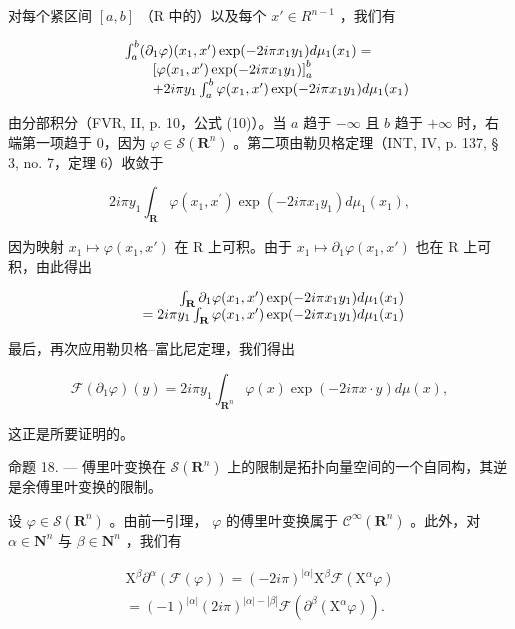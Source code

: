 对每个紧区间 \([a,b]\) （R 中的）以及每个 \(x'\in R^{n-1}\) ，我们有

\[
\begin{array}{r l} & {\int_ {a} ^ {b} (\partial_ {1} \varphi) (x _ {1}, x ^ {\prime}) \exp (- 2 i \pi x _ {1} y _ {1}) d \mu_ {1} (x _ {1}) =} \\ & {\qquad \left[ \varphi (x _ {1}, x ^ {\prime}) \exp (- 2 i \pi x _ {1} y _ {1}) \right] _ {a} ^ {b}} \\ & {\qquad + 2 i \pi y _ {1} \int_ {a} ^ {b} \varphi (x _ {1}, x ^ {\prime}) \exp (- 2 i \pi x _ {1} y _ {1}) d \mu_ {1} (x _ {1})} \end{array}
\]

由分部积分（FVR, II, p. 10，公式 (10)）。当 \(a\) 趋于 \(-\infty\) 且 \(b\) 趋于 \(+\infty\) 时，右端第一项趋于 0，因为 \(\varphi \in \mathcal{S}(\mathbf{R}^n)\) 。第二项由勒贝格定理（INT, IV, p. 137, § 3, no. 7，定理 6）收敛于

\[
2 i \pi y _ {1} \int_ {\mathbf {R}} \varphi (x _ {1}, x ^ {\prime}) \exp (- 2 i \pi x _ {1} y _ {1}) d \mu_ {1} (x _ {1}),
\]

因为映射 \(x_{1} \mapsto \varphi(x_{1}, x')\) 在 R 上可积。由于 \(x_{1} \mapsto \partial_{1}\varphi(x_{1}, x')\) 也在 R 上可积，由此得出

\[
\begin{array}{r l r} & & {\int_ {\mathbf {R}} \partial_ {1} \varphi (x _ {1}, x ^ {\prime}) \exp (- 2 i \pi x _ {1} y _ {1}) d \mu_ {1} (x _ {1})} \\ & & {= 2 i \pi y _ {1} \int_ {\mathbf {R}} \varphi (x _ {1}, x ^ {\prime}) \exp (- 2 i \pi x _ {1} y _ {1}) d \mu_ {1} (x _ {1})} \end{array}
\]

最后，再次应用勒贝格–富比尼定理，我们得出

\[
\mathcal {F} (\partial_ {1} \varphi) (y) = 2 i \pi y _ {1} \int_ {\mathbf {R} ^ {n}} \varphi (x) \exp (- 2 i \pi x \cdot y) d \mu (x),
\]

这正是所要证明的。

命题 18. --- 傅里叶变换在 \(\mathcal{S}(\mathbf{R}^{n})\) 上的限制是拓扑向量空间的一个自同构，其逆是余傅里叶变换的限制。

设 \(\varphi\in\mathcal{S}(\mathbf{R}^{n})\) 。由前一引理， \(\varphi\) 的傅里叶变换属于 \(\mathcal{C}^{\infty}(\mathbf{R}^{n})\) 。此外，对 \(\alpha\in\mathbf{N}^{n}\) 与 \(\beta\in\mathbf{N}^{n}\) ，我们有

\[
\begin{array}{r} \mathrm{X} ^ {\beta} \partial^ {\alpha} (\mathcal {F} (\varphi)) = (- 2 i \pi) ^ {| \alpha |} \mathrm{X} ^ {\beta} \mathcal {F} (\mathrm{X} ^ {\alpha} \varphi) \\ = (- 1) ^ {| \alpha |} (2 i \pi) ^ {| \alpha | - | \beta |} \mathcal {F} (\partial^ {\beta} (\mathrm{X} ^ {\alpha} \varphi)). \end{array}
\]

